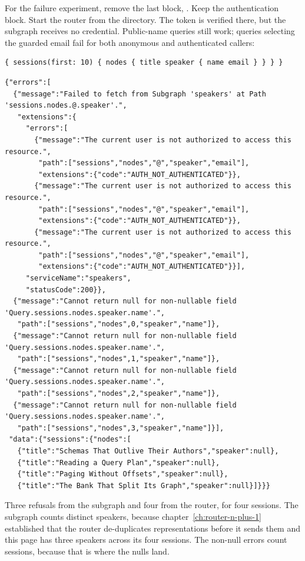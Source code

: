 For the failure experiment, remove the last block, .
Keep the authentication block. Start the router from the
 directory. The token is verified there, but the subgraph
receives no credential. Public-name queries still work; queries selecting
the guarded email fail for both anonymous and authenticated callers:

\begin{verbatim}
{ sessions(first: 10) { nodes { title speaker { name email } } } }
\end{verbatim}

\begin{verbatim}
{"errors":[
  {"message":"Failed to fetch from Subgraph 'speakers' at Path 'sessions.nodes.@.speaker'.",
   "extensions":{
     "errors":[
       {"message":"The current user is not authorized to access this resource.",
        "path":["sessions","nodes","@","speaker","email"],
        "extensions":{"code":"AUTH_NOT_AUTHENTICATED"}},
       {"message":"The current user is not authorized to access this resource.",
        "path":["sessions","nodes","@","speaker","email"],
        "extensions":{"code":"AUTH_NOT_AUTHENTICATED"}},
       {"message":"The current user is not authorized to access this resource.",
        "path":["sessions","nodes","@","speaker","email"],
        "extensions":{"code":"AUTH_NOT_AUTHENTICATED"}}],
     "serviceName":"speakers",
     "statusCode":200}},
  {"message":"Cannot return null for non-nullable field 'Query.sessions.nodes.speaker.name'.",
   "path":["sessions","nodes",0,"speaker","name"]},
  {"message":"Cannot return null for non-nullable field 'Query.sessions.nodes.speaker.name'.",
   "path":["sessions","nodes",1,"speaker","name"]},
  {"message":"Cannot return null for non-nullable field 'Query.sessions.nodes.speaker.name'.",
   "path":["sessions","nodes",2,"speaker","name"]},
  {"message":"Cannot return null for non-nullable field 'Query.sessions.nodes.speaker.name'.",
   "path":["sessions","nodes",3,"speaker","name"]}],
 "data":{"sessions":{"nodes":[
   {"title":"Schemas That Outlive Their Authors","speaker":null},
   {"title":"Reading a Query Plan","speaker":null},
   {"title":"Paging Without Offsets","speaker":null},
   {"title":"The Bank That Split Its Graph","speaker":null}]}}}
\end{verbatim}

%
Three refusals from the subgraph and four from the router, for four sessions.
The subgraph counts distinct speakers, because
chapter~\ref{ch:router-n-plus-1} established that the router de-duplicates
representations before it sends them and this page has three speakers across
its four sessions. The non-null errors count sessions, because that is where
the nulls land.

